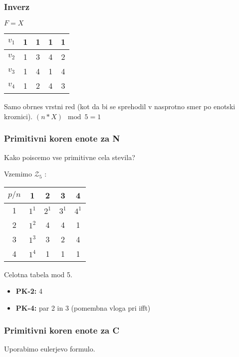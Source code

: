 \documentclass{article}
\begin{document}
\begin{multicols}{4}
\subsubsection{Inverz}
\begin{center}
    $F = X$
    \begin{tabular}{ |c|c|c|c|c| } 
        \hline
        $v_1$ &     1 & 1 & 1 & 1 \\ 
        \hline
        $v_2$ &     1 & 3 & 4 & 2\\  
        \hline
        $v_3$ &     1 & 4 & 1 & 4 \\
        \hline
        $v_4$ &     1 & 2 & 4 & 3 \\
        \hline
    \end{tabular}
\end{center}
Samo obrnes vrstni red (kot da bi se sprehodil v nasprotno smer po enotski kroznici).
$(n * X) \mod 5 = 1$
\subsubsection{Primitivni koren enote za N}
Kako poiscemo vse primitivne cela stevila?

Vzemimo  $\mathcal{Z}_5$ :
\begin{center}
    \begin{tabular}{ |c|c|c|c|c| } 
        \hline
        $p / n$ & 1 & 2 & 3 & 4 \\
        \hline
        1       & $1^1$ & $2^1$ & $3^1$ & $4^1$\\
        \hline
        2       & $1^2$ & 4 & 4 & 1 \\
        \hline
        3       & $1^3$ & 3 & 2 & 4 \\
        \hline
        4       & $1^4$ & 1 & 1 & 1 \\
        \hline
    \end{tabular}

Celotna tabela mod 5. 
\end{center}

\begin{itemize}
    \item \textbf{PK-2:} 4
    \item \textbf{PK-4:} par 2 in 3  (pomembna vloga pri ifft)
\end{itemize}

\subsubsection{Primitivni koren enote za C}
Uporabimo eulerjevo formulo.


\end{multicols}
\end{document}
